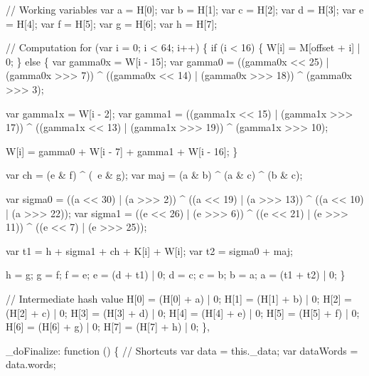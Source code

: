 \begin{DoxyCodeInclude}
            \textcolor{comment}{// Working variables}
            var a = H[0];
            var b = H[1];
            var c = H[2];
            var d = H[3];
            var e = H[4];
            var f = H[5];
            var g = H[6];
            var h = H[7];

            \textcolor{comment}{// Computation}
            \textcolor{keywordflow}{for} (var i = 0; i < 64; i++) \{
                \textcolor{keywordflow}{if} (i < 16) \{
                    W[i] = M[offset + i] | 0;
                \} \textcolor{keywordflow}{else} \{
                    var gamma0x = W[i - 15];
                    var gamma0  = ((gamma0x << 25) | (gamma0x >>> 7))  ^
                                  ((gamma0x << 14) | (gamma0x >>> 18)) ^
                                   (gamma0x >>> 3);

                    var gamma1x = W[i - 2];
                    var gamma1  = ((gamma1x << 15) | (gamma1x >>> 17)) ^
                                  ((gamma1x << 13) | (gamma1x >>> 19)) ^
                                   (gamma1x >>> 10);

                    W[i] = gamma0 + W[i - 7] + gamma1 + W[i - 16];
                \}

                var ch  = (e & f) ^ (~e & g);
                var maj = (a & b) ^ (a & c) ^ (b & c);

                var sigma0 = ((a << 30) | (a >>> 2)) ^ ((a << 19) | (a >>> 13)) ^ ((a << 10) | (a >>> 22));
                var sigma1 = ((e << 26) | (e >>> 6)) ^ ((e << 21) | (e >>> 11)) ^ ((e << 7)  | (e >>> 25));

                var t1 = h + sigma1 + ch + K[i] + W[i];
                var t2 = sigma0 + maj;

                h = g;
                g = f;
                f = e;
                e = (d + t1) | 0;
                d = c;
                c = b;
                b = a;
                a = (t1 + t2) | 0;
            \}

            \textcolor{comment}{// Intermediate hash value}
            H[0] = (H[0] + a) | 0;
            H[1] = (H[1] + b) | 0;
            H[2] = (H[2] + c) | 0;
            H[3] = (H[3] + d) | 0;
            H[4] = (H[4] + e) | 0;
            H[5] = (H[5] + f) | 0;
            H[6] = (H[6] + g) | 0;
            H[7] = (H[7] + h) | 0;
        \},

        \_doFinalize: \textcolor{keyword}{function} () \{
            \textcolor{comment}{// Shortcuts}
            var data = this.\_data;
            var dataWords = data.words;


\end{DoxyCodeInclude}
